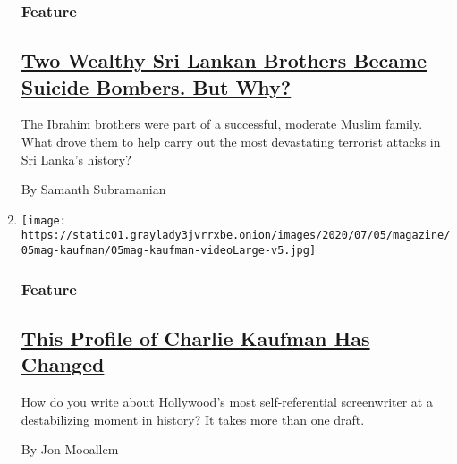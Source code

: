 \begin{enumerate}
  \hypertarget{feature-2}{%
  \subsubsection{Feature}\label{feature-2}}

  \hypertarget{two-wealthy-sri-lankan-brothers-became-suicide-bombers-but-why}{%
  \subsection{\texorpdfstring{\href{/2020/07/02/magazine/sri-lanka-brothers-bombing.html}{Two
  Wealthy Sri Lankan Brothers Became Suicide Bombers. But
  Why?}}{Two Wealthy Sri Lankan Brothers Became Suicide Bombers. But Why?}}\label{two-wealthy-sri-lankan-brothers-became-suicide-bombers-but-why}}

  The Ibrahim brothers were part of a successful, moderate Muslim
  family. What drove them to help carry out the most devastating
  terrorist attacks in Sri Lanka's history?

  By Samanth Subramanian
\item
  \texttt{[image: https://static01.graylady3jvrrxbe.onion/images/2020/07/05/magazine/05mag-kaufman/05mag-kaufman-videoLarge-v5.jpg]}

  \hypertarget{feature-3}{%
  \subsubsection{Feature}\label{feature-3}}

  \hypertarget{this-profile-of-charlie-kaufman-has-changed}{%
  \subsection{\texorpdfstring{\href{/2020/07/02/magazine/charlie-kaufman.html}{This
  Profile of Charlie Kaufman Has
  Changed}}{This Profile of Charlie Kaufman Has Changed}}\label{this-profile-of-charlie-kaufman-has-changed}}

  How do you write about Hollywood's most self-referential screenwriter
  at a destabilizing moment in history? It takes more than one draft.

  By Jon Mooallem
\end{enumerate}

